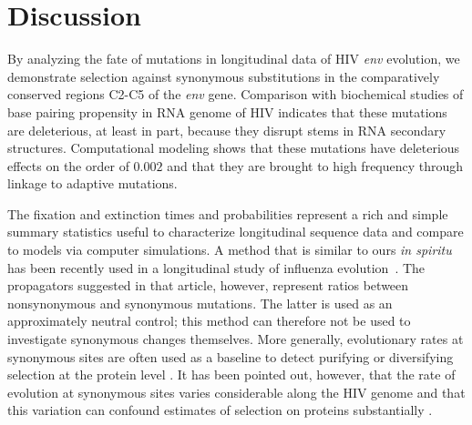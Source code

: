 \documentclass[rmp, twocolumn]{revtex4}
\newcommand{\env}{\textit{env}}
\begin{document}
\section{Discussion}
By analyzing the fate of mutations in longitudinal data of HIV \env{} evolution,
we demonstrate selection against synonymous substitutions in the comparatively
conserved regions C2-C5 of the \env{} gene. Comparison with biochemical studies
of base pairing propensity in RNA genome of HIV indicates that these
mutations are deleterious, at least in part, because they disrupt stems in RNA
secondary structures. Computational modeling shows that these mutations have
deleterious effects on the order of $0.002$ and that they are brought to high
frequency through linkage to adaptive mutations.

The fixation and extinction times and probabilities represent a rich and simple
summary statistics useful to characterize longitudinal sequence data and compare
to models via computer simulations. A method that is similar to ours {\it in
spiritu} has been recently used in a longitudinal study of influenza
evolution~\citep{strelkowa_clonal_2012}. The propagators suggested in that
article, however, represent ratios between nonsynonymous and synonymous
mutations. The latter is used as an approximately neutral control; this method
can therefore not be used to investigate synonymous changes themselves. More
generally, evolutionary rates at synonymous sites are often used as a baseline
to detect purifying or diversifying selection at the protein level
\cite{Hurst:2002p32608}. It has been pointed out, however, that the rate of
evolution at synonymous sites varies considerable along the HIV genome
\citep{mayrose_towards_2007} and that this variation can confound estimates of
selection on proteins substantially \citep{ngandu_extensive_2008}.
\end{document}
